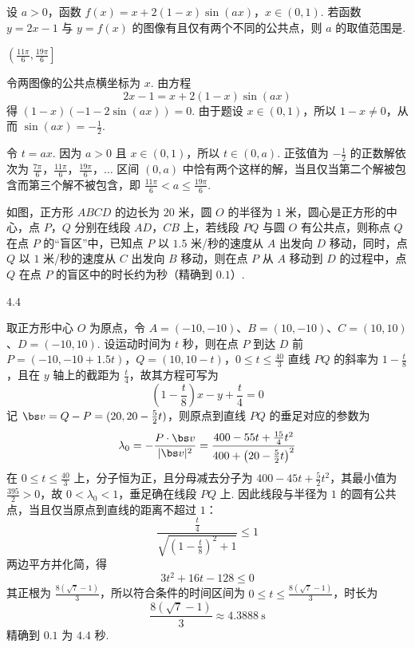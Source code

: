 \begin{problem}
设 \(a>0\)，函数 \(f(x)=x+2(1-x)\sin(ax)\)，\(x\in(0,1)\). 若函数 \(y=2x-1\) 与 \(y=f(x)\) 的图像有且仅有两个不同的公共点，则 \(a\) 的取值范围是\fillinblank{}.
\end{problem}

\begin{answer}
\(\left(\frac{11\pi}{6},\frac{19\pi}{6}\right]\)
\end{answer}

\begin{solution}
令两图像的公共点横坐标为 \(x\). 由方程
\[
2x-1=x+2(1-x)\sin(ax)
\]
得 \((1-x)(-1-2\sin(ax))=0\). 由于题设 \(x\in(0,1)\)，所以 \(1-x\ne0\)，从而 \(\sin(ax)=-\frac12\).

令 \(t=ax\). 因为 \(a>0\) 且 \(x\in(0,1)\)，所以 \(t\in(0,a)\). 正弦值为 \(-\frac12\) 的正数解依次为
\(\frac{7\pi}{6}\)，\(\frac{11\pi}{6}\)，\(\frac{19\pi}{6}\)，\(\ldots\)
区间 \((0,a)\) 中恰有两个这样的解，当且仅当第二个解被包含而第三个解不被包含，即 \(\frac{11\pi}{6}<a\le\frac{19\pi}{6}\).
\end{solution}

\begin{problem}
如图，正方形 \(ABCD\) 的边长为 \(20\) 米，圆 \(O\) 的半径为 \(1\) 米，圆心是正方形的中心，点 \(P\)，\(Q\) 分别在线段 \(AD\)，\(CB\) 上，若线段 \(PQ\) 与圆 \(O\) 有公共点，则称点 \(Q\) 在点 \(P\) 的“盲区”中，已知点 \(P\) 以 \(1.5\) 米/秒的速度从 \(A\) 出发向 \(D\) 移动，同时，点 \(Q\) 以 \(1\) 米/秒的速度从 \(C\) 出发向 \(B\) 移动，则在点 \(P\) 从 \(A\) 移动到 \(D\) 的过程中，点 \(Q\) 在点 \(P\) 的盲区中的时长约为\fillinblank{}秒（精确到 \(0.1\)）.

\end{problem}

\begin{answer}
\(4.4\)
\end{answer}

\begin{solution}
取正方形中心 \(O\) 为原点，令 \(A=(-10,-10)\)、\(B=(10,-10)\)、\(C=(10,10)\)、\(D=(-10,10)\). 设运动时间为 \(t\) 秒，则在点 \(P\) 到达 \(D\) 前
\(P=(-10,-10+1.5t)\)，\(Q=(10,10-t)\)，\(0\le t\le\frac{40}{3}\)
直线 \(PQ\) 的斜率为 \(1-\frac t8\)，且在 \(y\) 轴上的截距为 \(\frac t4\)，故其方程可写为
\[
\left(1-\frac t8\right)x-y+\frac t4=0
\]
记 \(\bs v=Q-P=(20,20-\frac52t)\)，则原点到直线 \(PQ\) 的垂足对应的参数为
\[
\lambda_0=-\frac{P\cdot\bs v}{\lvert\bs v\rvert^2}
=\frac{400-55t+\frac{15}{4}t^2}{400+\left(20-\frac52t\right)^2}
\]
在 \(0\le t\le\frac{40}{3}\) 上，分子恒为正，且分母减去分子为 \(400-45t+\frac52t^2\)，其最小值为 \(\frac{395}{2}>0\)，故 \(0<\lambda_0<1\)，垂足确在线段 \(PQ\) 上. 因此线段与半径为 \(1\) 的圆有公共点，当且仅当原点到直线的距离不超过 \(1\)：
\[
\frac{\frac{t}{4}}{\sqrt{\left(1-\frac t8\right)^2+1}}\le1
\]
两边平方并化简，得
\[
3t^2+16t-128\le0
\]
其正根为 \(\frac{8(\sqrt7-1)}3\)，所以符合条件的时间区间为 \(0\le t\le\frac{8(\sqrt7-1)}3\)，时长为
\[
\frac{8(\sqrt7-1)}3\approx4.3888\ \mathrm{s}
\]
精确到 \(0.1\) 为 \(4.4\) 秒.
\end{solution}

